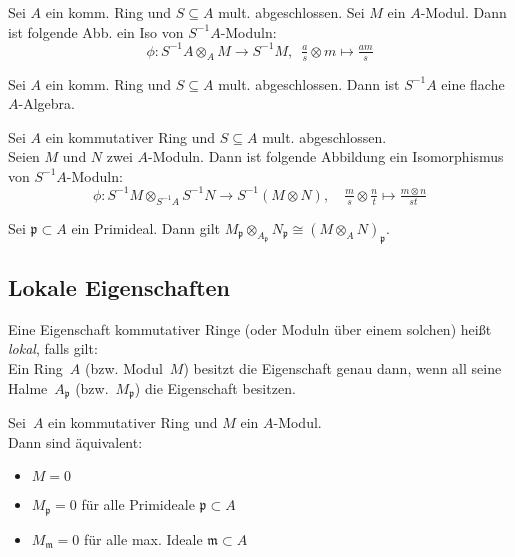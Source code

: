 \documentclass{cheat-sheet}
\newcommand{\ppp}{\mathfrak{p}}
\newcommand{\mmm}{\mathfrak{m}}
\begin{document}

\begin{prop}
  Sei $A$ ein komm. Ring und $S \subseteq A$ mult. abgeschlossen.
  Sei $M$ ein $A$-Modul.
  Dann ist folgende Abb. ein Iso von $S^{-1} A$-Moduln:
  \[
    \phi : S^{-1} A \otimes_A M \to S^{-1} M, \enspace \tfrac{a}{s} \otimes m \mapsto \tfrac{a m}{s}
  \]
\end{prop}

\begin{kor}
  Sei $A$ ein komm. Ring und $S \subseteq A$ mult. abgeschlossen.
  Dann ist $S^{-1} A$ eine flache $A$-Algebra.
\end{kor}

\begin{prop}
  Sei $A$ ein kommutativer Ring und $S \subseteq A$ mult. abgeschlossen. \\
  Seien $M$ und $N$ zwei $A$-Moduln.
  Dann ist folgende Abbildung ein Isomorphismus von $S^{-1} A$-Moduln:
  \[
    \phi : S^{-1} M \otimes_{S^{-1} A} S^{-1} N \to S^{-1} (M \otimes N), \quad
    \tfrac{m}{s} \otimes \tfrac{n}{t} \mapsto \tfrac{m \otimes n}{s t}
  \]
\end{prop}

\begin{bsp}
  Sei $\ppp \subset A$ ein Primideal.
  Dann gilt $M_\ppp \otimes_{A_\ppp} N_\ppp \cong (M \otimes_A N)_\ppp$.
\end{bsp}

\subsection{Lokale Eigenschaften}

\begin{sprech}
  Eine Eigenschaft kommutativer Ringe (oder Moduln über einem solchen) heißt \emph{lokal}, falls gilt: \\[2pt]
  Ein Ring~$A$ (bzw. Modul~$M$) besitzt die Eigenschaft genau dann, wenn all seine Halme~$A_\ppp$ (bzw.~$M_\ppp$) die Eigenschaft besitzen.
\end{sprech}


\begin{prop}
  Sei~$A$ ein kommutativer Ring und $M$ ein $A$-Modul. \\
  Dann sind äquivalent:
  \begin{itemize}
    \item $M = 0$
    \item $M_\ppp = 0$ für alle Primideale $\ppp \subset A$
    \item $M_\mmm = 0$ für alle max. Ideale $\mmm \subset A$
  \end{itemize}
\end{prop}
\end{document}
